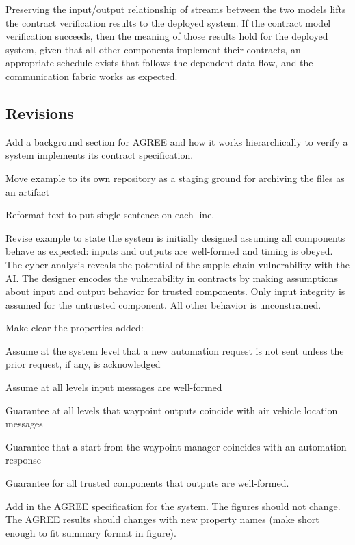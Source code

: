 Preserving the input/output relationship of streams between the two models lifts the contract verification results to the deployed system. If the contract model verification succeeds, then the meaning of those results hold for the deployed system, given that all other components implement their contracts, an appropriate schedule exists that follows the dependent data-flow, and the communication fabric works as expected.

\subsection{Revisions}
Add a background section for AGREE and how it works hierarchically to verify a system implements its contract specification.

Move example to its own repository as a staging ground for archiving the files as an artifact

Reformat text to put single sentence on each line.

Revise example to state the system is initially designed assuming all components behave as expected: inputs and outputs are well-formed and timing is obeyed.
The cyber analysis reveals the potential of the supple chain vulnerability with the AI.
The designer encodes the vulnerability in contracts by making assumptions about input and output behavior for trusted components.
Only input integrity is assumed for the untrusted component.
All other behavior is unconstrained.

Make clear the properties added:
\begin{compactitem}
  \item Assume at the system level that a new automation request is not sent unless the prior request, if any, is acknowledged
  \item Assume at all levels input messages are well-formed
  \item Guarantee at all levels that waypoint outputs coincide with air vehicle location messages
  \item Guarantee that a start from the waypoint manager coincides with an automation response
  \item Guarantee for all trusted components that outputs are well-formed.
\end{compactitem}

Add in the AGREE specification for the system.
The figures should not change.
The AGREE results should changes with new property names (make short enough to fit summary format in figure).